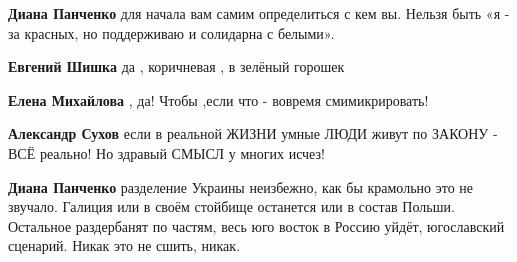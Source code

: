 \begin{itemize}
\begin{itemize}
 
\textbf{Диана Панченко} для начала вам самим определиться с кем вы. Нельзя быть «я - за красных, но поддерживаю и солидарна с белыми».

 
\textbf{Евгений Шишка} да , коричневая , в зелёный горошек

 
\textbf{Елена Михайлова} , да! Чтобы ,если что - вовремя смимикрировать!

 
\textbf{Александр Сухов} если в реальной ЖИЗНИ умные ЛЮДИ живут по ЗАКОНУ - ВСЁ реально! Но здравый СМЫСЛ у многих исчез!

 
\textbf{Диана Панченко} разделение Украины неизбежно, как бы крамольно это не
звучало. Галиция или в своём стойбище останется или в состав Польши. Остальное
раздербанят по частям, весь юго восток в Россию уйдёт, югославский сценарий.
Никак это не сшить, никак.

 

\end{itemize}
\end{itemize}
